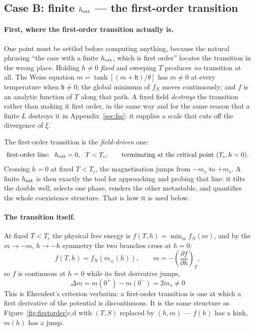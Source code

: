 \documentclass[10pt,a4paper]{article}
\theoremstyle{remark}
\begin{document}
\subsection{Case B: finite $h_{\rm ext}$ --- the first-order transition}
\label{sec:appising:caseB}

\paragraph{First, where the first-order transition actually is.} One point must be
settled before computing anything, because the natural phrasing ``the case with a
finite $h_{\rm ext}$, which is first order'' locates the transition in the wrong
place. Holding $h\neq0$ \emph{fixed} and sweeping $T$ produces \emph{no}
transition at all. The Weiss equation $m=\tanh[(m+\mathfrak{h})/\theta]$ has
$m\neq0$ at every temperature when $\mathfrak{h}\neq0$; the global minimum of
$f_N$ moves continuously; and $f$ is an analytic function of $T$ along that path.
A fixed field \emph{destroys} the transition rather than making it first order,
in the same way and for the same reason that a finite $L$ destroys it in
Appendix~\ref{sec:fss}: it supplies a scale that cuts off the divergence of $\xi$.

The first-order transition is the \emph{field-driven} one:
\[
\;
\text{first-order line: }\ h_{\rm ext}=0,\ \ T<T_c ,
\qquad\text{terminating at the critical point }(T_c,h=0).\
\]
Crossing $h=0$ at fixed $T<T_c$, the magnetisation jumps from $-m_s$ to $+m_s$.
A finite $h_{\rm ext}$ is then exactly the tool for approaching and probing that
line: it tilts the double well, selects one phase, renders the other metastable,
and quantifies the whole coexistence structure. That is how it is used below.

\paragraph{The transition itself.} At fixed $T<T_c$ the physical free energy is
$f(T,h)=\min_m f_N(m)$, and by the $m\to-m$, $h\to-h$ symmetry the two branches
cross at $h=0$:
\[
f(T,h)=f_N(m_\pm(h)),\qquad
m=-\left(\frac{\partial f}{\partial h}\right)_T ,
\]
so $f$ is continuous at $h=0$ while its first derivative jumps,
\[
\;\Delta m=m(0^{+})-m(0^{-})=2m_s\neq0\
\]
This is Ehrenfest's criterion verbatim: a first-order transition is one at which a
first derivative of the potential is discontinuous. It is the same structure as
Figure~\ref{fig:firstorder}c,d with $(T,S)$ replaced by $(h,m)$ --- $f(h)$ has a
kink, $m(h)$ has a jump.
\end{document}
